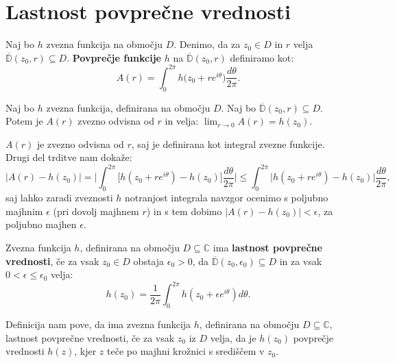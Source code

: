 \documentclass[mat1]{fmfdelo}
\newcommand{\C}{\mathbb C}
\begin{document}
\section{Lastnost povprečne vrednosti}

    \begin{definicija}  
        Naj bo $h$ zvezna funkcija na območju $D$. Denimo, da za $z_0 \in D$ in $r$ velja  $\overline{\mathbb{D}}(z_0, r) \subseteq D$. \textbf{Povprečje funkcije} $h$ na $\overline{\mathbb{D}}(z_0, r)$ definiramo kot:
        $$
            A(r) = \int_{0}^{2 \pi}{h \big(z_0 + r e^{i\theta}\big)\frac{d\theta}{2 \pi}}.
        $$
    \end{definicija}
    \begin{trditev}
        \label{zvpov}
        Naj bo $h$ zvezna funkcija, definirana na območju $D$. Naj bo $\overline{\mathbb{D}}(z_0, r) \subseteq D$. 
        Potem je $A(r)$ zvezno odvisna od $r$ in velja: $\lim_{r \to 0}{A(r)} = h(z_0)$.
    \end{trditev}
    \begin{dokaz}
        $A(r)$ je zvezno odvisna od $r$, saj je definirana kot integral zvezne funkcije. Drugi del trditve nam dokaže:
        $$
            |A(r) - h(z_0)| = \bigg|\int_{0}^{2\pi} \big[h(z_0 + r e^{i\theta})  - h(z_0)\big] \frac{d\theta}{2\pi} \bigg| \leq \int_{0}^{2 \pi} \big| h(z_0 + r e^{i\theta}) - h(z_0) \big| \frac{d\theta}{2 \pi},
        $$
        saj lahko zaradi zveznosti $h$ notranjost integrala navzgor ocenimo s poljubno majhnim $\epsilon$ (pri dovolj majhnem $r$) in s tem dobimo $|A(r) - h(z_0)| < \epsilon$, za poljubno majhen $\epsilon$. 
    \end{dokaz}

    \begin{definicija}
        Zvezna funkcija $h$, definirana na območju $D \subseteq \C$ ima \textbf{lastnost povprečne vrednosti}, če za vsak $z_0 \in D$ obstaja $\epsilon_0 > 0$, da $\overline{\mathbb{D}}(z_0, \epsilon_0) \subseteq D$ in za vsak $0 < \epsilon \leq \epsilon_0 $ velja:
        $$
            h(z_0) = \frac{1}{2 \pi} \int_{0}^{2 \pi}{h(z_0 + \epsilon e^{i \theta}) d\theta}.
        $$
    \end{definicija}
    \begin{opomba}
        Definicija nam pove, da ima zvezna funkcija $h$, definirana na območju $D \subseteq \C$, lastnost povprečne vrednosti, če za vsak $z_0$ iz $D$ velja, 
        da je $h(z_0)$ povprečje vrednosti $h(z)$, kjer $z$ teče po majhni krožnici s središčem v $z_0$.
    \end{opomba}
\end{document}
